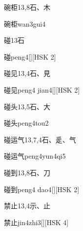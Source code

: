 \begin{entry}{碗柜}{13,8}{⽯、⽊}
  \begin{phonetics}{碗柜}{wan3gui4}
  \end{phonetics}
\end{entry}

\begin{entry}{碰}{13}{⽯}
  \begin{phonetics}{碰}{peng4}[][HSK 2]
  \end{phonetics}
\end{entry}

\begin{entry}{碰见}{13,4}{⽯、⾒}
  \begin{phonetics}{碰见}{peng4 jian4}[][HSK 2]
  \end{phonetics}
\end{entry}

\begin{entry}{碰头}{13,5}{⽯、⼤}
  \begin{phonetics}{碰头}{peng4tou2}
  \end{phonetics}
\end{entry}

\begin{entry}{碰运气}{13,7,4}{⽯、⾡、⽓}
  \begin{phonetics}{碰运气}{peng4yun4qi5}
  \end{phonetics}
\end{entry}

\begin{entry}{碰到}{13,8}{⽯、⼑}
  \begin{phonetics}{碰到}{peng4 dao4}[][HSK 2]
  \end{phonetics}
\end{entry}

\begin{entry}{禁止}{13,4}{⽰、⽌}
  \begin{phonetics}{禁止}{jin4zhi3}[][HSK 4]
  \end{phonetics}
\end{entry}

